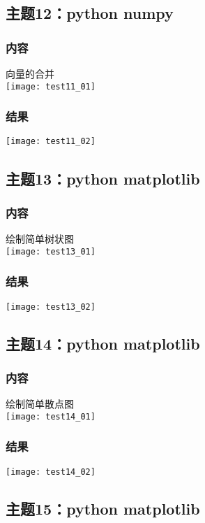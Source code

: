 \documentclass{article}
\begin{document}
\subsection{主题12：python numpy}  
\subsubsection{内容}
向量的合并\\
\texttt{[image: test11\_01]}\\
\subsubsection{结果}  
\texttt{[image: test11\_02]}\\
\vspace{1cm}
\subsection{主题13：python matplotlib}  
\subsubsection{内容}
绘制简单树状图\\
\texttt{[image: test13\_01]}\\
\subsubsection{结果}  
\texttt{[image: test13\_02]}\\
\vspace{1cm}
\subsection{主题14：python matplotlib}  
\subsubsection{内容}
绘制简单散点图\\
\texttt{[image: test14\_01]}\\
\subsubsection{结果}  
\texttt{[image: test14\_02]}\\
\newpage
\thispagestyle{empty}
\subsection{主题15：python matplotlib}  
\end{document}
